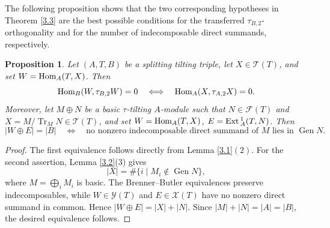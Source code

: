 \documentclass[reqno,12pt]{amsart}
\numberwithin{equation}{section}
\def\Ext{\mbox{\rm Ext}\,} \def\Hom{\mbox{\rm Hom}} \def\dim{\mbox{\rm dim}} \def\Iso{\mbox{\rm Iso}\,}
\theoremstyle{plain}
\newtheorem{proposition}[theorem]{\bf Proposition}
\theoremstyle{definition}
\begin{document}
The following proposition shows that the two corresponding hypotheses in Theorem \ref{3.3} are the best possible conditions for the transferred $\tau_{B,2}$-orthogonality and for the number of indecomposable direct summands, respectively.


\begin{proposition}\label{sharp-transfer}
Let $(A,T,B)$ be a splitting tilting triple, let $X\in\mathcal{T}(T)$, and set
$W=\Hom_A(T,X)$. Then
\[
\Hom_B(W,\tau_{B,2}W)=0
\quad\Longleftrightarrow\quad
\Hom_A(X,\tau_{A,2}X)=0.
\]
Moreover, let $M\oplus N$ be a basic $\tau$-tilting $A$-module such that
$N\in\mathcal{F}(T)$ and $X=M/\operatorname{Tr}_MN\in\mathcal{T}(T)$, and set $W=\Hom_A(T,X)$,
$E=\Ext_A^1(T,N)$. Then
\[
|W\oplus E|=|B|
\quad\Longleftrightarrow\quad
\text{no nonzero indecomposable direct summand of $M$ lies in $\operatorname{Gen} N$}.
\]
\end{proposition}
\begin{proof}
The first equivalence follows directly from Lemma \ref{3.1}$(2)$. For the second assertion, Lemma \ref{3.2}(3) gives
\[
|X|=\#\{i\mid M_i\notin\operatorname{Gen} N\},
\]
where $M=\bigoplus_iM_i$ is basic. The Brenner--Butler equivalences preserve indecomposables, while $W\in\mathcal{Y}(T)$ and $E\in\mathcal{X}(T)$ have no nonzero direct summand in common. Hence
$|W\oplus E|=|X|+|N|$. Since $|M|+|N|=|A|=|B|$, the desired equivalence follows.
\end{proof}
\end{document}
